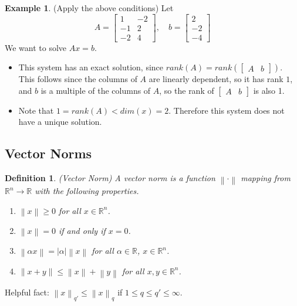 \documentclass[12pt]{article}
\newtheorem{definition}{Definition}
\theoremstyle{definition}
\newtheorem{example}{Example}
\newcommand{\R}{\mathbb{R}}
\newcommand{\norm}[1]{\left\lVert#1\right\rVert}
\begin{document}
\begin{example}(Apply the above conditions)
Let
\begin{equation}
	A = 
	\begin{bmatrix}
	1 & -2 \\
	-1 & 2 \\
	-2 & 4
	\end{bmatrix},
	\quad
	b = 
	\begin{bmatrix}
	2 \\ -2 \\ -4
	\end{bmatrix}
\end{equation}
We want to solve $Ax = b$. 
\begin{itemize}
	\item This system has an exact solution, since $rank(A) = rank(\begin{bmatrix} A & b\end{bmatrix})$. This follows since the columns of $A$ are linearly dependent, so it has rank $1$, and $b$ is a multiple of the columns of $A$, so the rank of $\begin{bmatrix} A & b\end{bmatrix}$ is also 1. 
	\item Note that $1 = rank(A) < dim(x) = 2$. Therefore this system does not have a unique solution. 
\end{itemize}
\end{example}

\subsection{Vector Norms}

\begin{definition}(Vector Norm)
A vector norm is a function $\norm{\cdot}$ mapping from $\R^n \to \R$ with the following properties. 
\begin{enumerate}
	\item $\norm{x} \geq 0$ for all $x \in \R^n$.
	\item $\norm{x} = 0$ if and only if $x = 0$. 
	\item $\norm{\alpha x} = |\alpha|\norm{x}$ for all $\alpha \in \R$, $x \in \R^n$. 
	\item $\norm{x + y} \leq \norm{x} + \norm{y}$ for all $x, y \in \R^n$. 
\end{enumerate}
\end{definition}

Helpful fact: $\norm{x}_{q'} \leq \norm{x}_q$ if $1 \leq q \leq q' \leq \infty$. 
\end{document}
